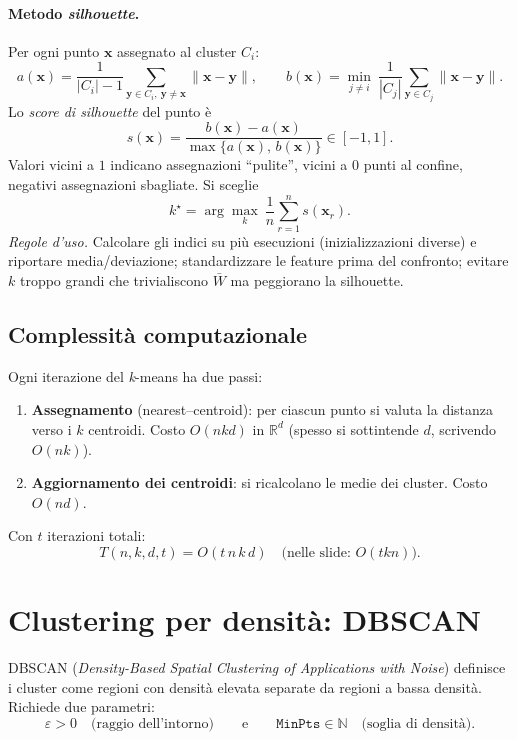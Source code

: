 \paragraph{Metodo \emph{silhouette}.}
Per ogni punto $\mathbf{x}$ assegnato al cluster $C_i$:
\[
a(\mathbf{x})=\frac{1}{|C_i|-1}\sum_{\mathbf{y}\in C_i,\ \mathbf{y}\neq \mathbf{x}}\!\!\!\!\|\mathbf{x}-\mathbf{y}\|, \qquad
b(\mathbf{x})=\min_{j\neq i}\ \frac{1}{|C_j|}\sum_{\mathbf{y}\in C_j}\|\mathbf{x}-\mathbf{y}\|.
\]
Lo \emph{score di silhouette} del punto è
\[
s(\mathbf{x})=\frac{b(\mathbf{x})-a(\mathbf{x})}{\max\{a(\mathbf{x}),\,b(\mathbf{x})\}}\in[-1,1].
\]
Valori vicini a $1$ indicano assegnazioni “pulite”, vicini a $0$ punti al confine, negativi assegnazioni sbagliate. Si sceglie
\[
k^\star=\arg\max_k\ \frac{1}{n}\sum_{r=1}^n s(\mathbf{x}_r).
\]
\emph{Regole d’uso.} Calcolare gli indici su più esecuzioni (inizializzazioni diverse) e riportare media/deviazione; standardizzare le feature prima del confronto; evitare $k$ troppo grandi che trivialiscono $\bar W$ ma peggiorano la silhouette.


\subsection{Complessità computazionale}\label{subsec:kmeans-compl}
Ogni iterazione del \emph{k}-means ha due passi:
\begin{enumerate}
  \item \textbf{Assegnamento} (nearest–centroid): per ciascun punto si valuta la distanza verso i $k$ centroidi. Costo $O(nkd)$ in $\mathbb{R}^d$ (spesso si sottintende $d$, scrivendo $O(nk)$).
  \item \textbf{Aggiornamento dei centroidi}: si ricalcolano le medie dei cluster. Costo $O(nd)$.
\end{enumerate}
Con $t$ iterazioni totali:
\[
T(n,k,d,t)=O(t\,n\,k\,d)\quad\text{(nelle slide: }O(tkn)\text{)}.
\]


\section{Clustering per densità: DBSCAN}\label{sec:dbscan}
DBSCAN (\emph{Density-Based Spatial Clustering of Applications with Noise}) definisce i cluster come regioni con densità elevata separate da regioni a bassa densità. Richiede due parametri:
\[
\varepsilon>0 \quad\text{(raggio dell'intorno)}\qquad\text{e}\qquad \texttt{MinPts}\in\mathbb{N}\quad\text{(soglia di densità)}.
\]

